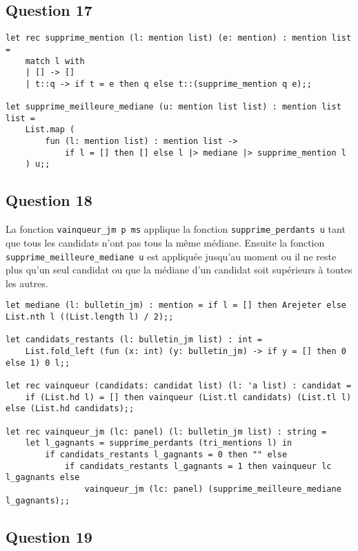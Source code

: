 \documentclass[french, 10pt, a4paper]{article}
\begin{document}
\subsection{Question 17}

\begin{verbatim}
let rec supprime_mention (l: mention list) (e: mention) : mention list =
	match l with
	| [] -> []
	| t::q -> if t = e then q else t::(supprime_mention q e);;

let supprime_meilleure_mediane (u: mention list list) : mention list list =
	List.map (
		fun (l: mention list) : mention list ->
			if l = [] then [] else l |> mediane |> supprime_mention l
	) u;;
\end{verbatim}



\subsection{Question 18}

La fonction \texttt{vainqueur_jm p ms} applique la fonction \texttt{supprime_perdants u} tant que tous les candidats n'ont pas tous la même médiane. Ensuite la fonction \texttt{supprime_meilleure_mediane u} est appliquée jusqu'au moment ou il ne reste plus qu'un seul candidat ou que la médiane d'un candidat soit supérieurs à toutes les autres.

\begin{verbatim}
let mediane (l: bulletin_jm) : mention = if l = [] then Arejeter else List.nth l ((List.length l) / 2);;

let candidats_restants (l: bulletin_jm list) : int =
	List.fold_left (fun (x: int) (y: bulletin_jm) -> if y = [] then 0 else 1) 0 l;; 

let rec vainqueur (candidats: candidat list) (l: 'a list) : candidat =
	if (List.hd l) = [] then vainqueur (List.tl candidats) (List.tl l) else (List.hd candidats);;

let rec vainqueur_jm (lc: panel) (l: bulletin_jm list) : string = 
	let l_gagnants = supprime_perdants (tri_mentions l) in
		if candidats_restants l_gagnants = 0 then "" else
			if candidats_restants l_gagnants = 1 then vainqueur lc l_gagnants else 
				vainqueur_jm (lc: panel) (supprime_meilleure_mediane l_gagnants);;
\end{verbatim}



\subsection{Question 19}
\end{document}
